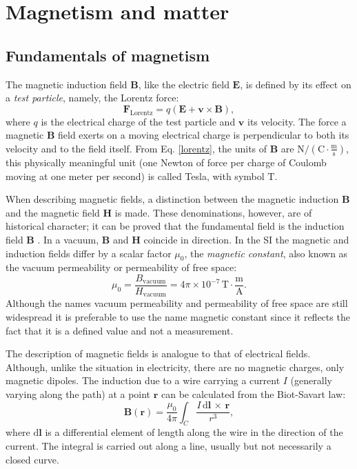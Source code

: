 \section{Magnetism and matter}
\subsection{Fundamentals of magnetism}
The magnetic induction field $\boldsymbol{B}$, like the electric field $\boldsymbol{E}$, is defined by its effect on a \textit{test particle}, namely, the Lorentz force:
\begin{equation}\label{lorentz}
\boldsymbol{F}_\text{Lorentz} = q(\boldsymbol{E} + \boldsymbol{v}\times\boldsymbol{B}),
\end{equation}
where $q$ is the electrical charge of the test particle and $\boldsymbol{v}$ its velocity. The force a magnetic $\boldsymbol{B}$ field exerts on a moving electrical charge is perpendicular to both its velocity and to the field itself. From Eq. \ref{lorentz}, the units of $\boldsymbol{B}$ are $\text{N}/(\text{C}\cdot\frac{\text{m}}{\text{s}})$, this physically meaningful unit (one Newton of force per charge of Coulomb moving at one meter per second) is called Tesla, with symbol $\text{T}$.\par

When describing magnetic fields, a distinction between the magnetic induction $\boldsymbol{B}$ and the magnetic field $\boldsymbol{H}$ is made. These denominations, however, are of historical character; it can be proved that the fundamental field is the induction field $\boldsymbol{B}$ \citep{Feynman}. In a vacuum, $\boldsymbol{B}$ and $\boldsymbol{H}$ coincide in direction. In the SI the magnetic and induction fields differ by a scalar factor $\mu_0$, the \textit{magnetic constant}, also known as the vacuum permeability or permeability of free space:
\begin{equation}
\mu_0 = \frac{B_{\text{vacuum}}}{H_{\text{vacuum}}} = 4 \pi \times 10^{-7} \, \text{T}\cdot\frac{\text{m}}{\text{A}}.
\end{equation}
Although the names vacuum permeability and permeability of free space are still widespread it is preferable to use the name magnetic constant since it reflects the fact that it is a defined value and not a measurement.\par

The description of magnetic fields is analogue to that of electrical fields. Although, unlike the situation in electricity, there are no magnetic charges, only magnetic dipoles. The induction due to a wire carrying a current $I$ (generally varying along the path) at a point $\boldsymbol{r}$ can be calculated from the Biot-Savart law:
\begin{equation}
\boldsymbol{B}(\boldsymbol{r}) = \frac{\mu_0}{4\pi} \int_C \frac{I\, \text{d}\boldsymbol{l}\, \times \, \boldsymbol{r}}{r^3},
\end{equation}
where $\text{d}\boldsymbol{l}$ is a differential element of length along the wire in the direction of the current. The integral is carried out along a line, usually but not necessarily a closed curve.\par

